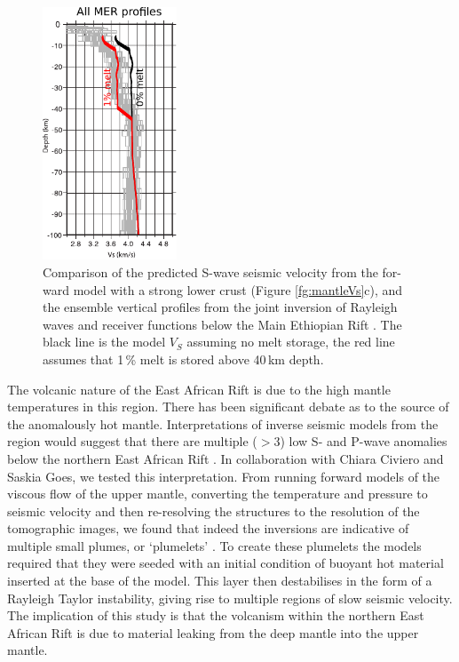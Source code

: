 \begin{figure}
\centering
\includegraphics[width=4cm]{./figures/ch2-MER-Vs.pdf}
\caption{Comparison of the predicted S-wave seismic velocity from the for-ward model with a strong lower crust (Figure \ref{fg:mantleVs}c), and the ensemble vertical profiles from the joint inversion of Rayleigh waves and receiver functions below the Main Ethiopian Rift \citep{keranen-etal-2009}. The black line is the model $V_{S}$ assuming no melt storage, the red line assumes that 1\,\% melt is stored above 40\,km depth.}
\label{fg:MER-Vs}
\end{figure}

The volcanic nature of the East African Rift is due to the high mantle temperatures in this region. There has been significant debate as to the source of the anomalously hot mantle. Interpretations of inverse seismic models from the region would suggest that there are multiple ($>3$) low S- and P-wave anomalies below the northern East African Rift \citep[e.g.]{chang-vanderlee-2011,hammond-etal-2013,emry-etal-2019}. In collaboration with Chiara Civiero and Saskia Goes, we tested this interpretation. From running forward models of the viscous flow of the upper mantle, converting the temperature and pressure to seismic velocity and then re-resolving the structures to the resolution of the tomographic images, we found that indeed the inversions are indicative of multiple small plumes, or `plumelets' \citep{civiero-etal-2019}. To create these plumelets the models required that they were seeded with an initial condition of buoyant hot  material inserted at the base of the model. This layer then destabilises in the form of a Rayleigh Taylor instability, giving rise to multiple regions of slow seismic velocity. The implication of this study is that the volcanism within the northern East African Rift is due to material leaking from the deep mantle into the upper mantle. 

